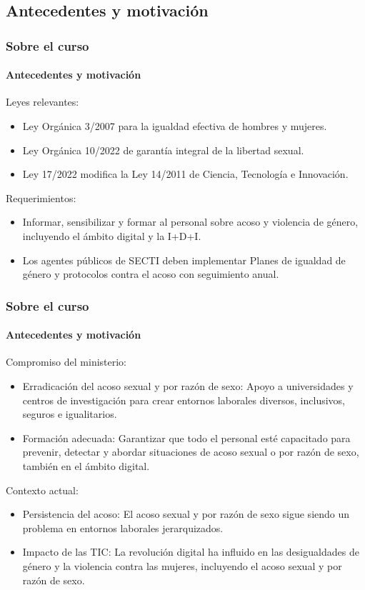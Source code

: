 \documentclass{beamer}
\newcommand{\highlight}[1]{{\color{Blue} #1}}
\begin{document}
    \subsection{Antecedentes y motivación}
    \begin{frame}
		\frametitle{Sobre el curso}
        \framesubtitle{Antecedentes y motivación}
            Leyes relevantes:
            \begin{itemize}
            \item \highlight{Ley Orgánica 3/2007} para la igualdad efectiva de hombres y mujeres.
            \item \highlight{Ley Orgánica 10/2022} de garantía integral de la libertad sexual.
            \item \highlight{Ley 17/2022} modifica la Ley 14/2011 de Ciencia, Tecnología e Innovación.
            \end{itemize}
            Requerimientos:
            \begin{itemize}
            \item \highlight{Informar, sensibilizar y formar} al personal sobre acoso y violencia de género, incluyendo el ámbito digital y la I+D+I.
            \item Los agentes públicos de SECTI deben implementar \highlight{Planes de igualdad de género} y protocolos contra el acoso con seguimiento anual.
            \end{itemize}
    \end{frame}
    \begin{frame}
		\frametitle{Sobre el curso}
        \framesubtitle{Antecedentes y motivación}
            Compromiso del ministerio:
            \begin{itemize}
            \item \highlight{Erradicación del acoso sexual y por razón de sexo}: Apoyo a universidades y centros de investigación para crear entornos laborales diversos, inclusivos, seguros e igualitarios.
            \item \highlight{Formación adecuada}: Garantizar que todo el personal esté capacitado para prevenir, detectar y abordar situaciones de acoso sexual o por razón de sexo, también en el ámbito digital.
            \end{itemize}
            Contexto actual:
            \begin{itemize}
            \item \highlight{Persistencia del acoso}: El acoso sexual y por razón de sexo sigue siendo un problema en entornos laborales jerarquizados.
            \item \highlight{Impacto de las TIC}: La revolución digital ha influido en las desigualdades de género y la violencia contra las mujeres, incluyendo el acoso sexual y por razón de sexo.
            \end{itemize}
    \end{frame}
\end{document}
